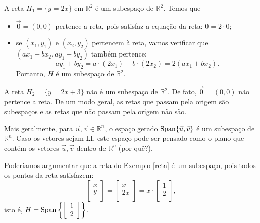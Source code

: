 \documentclass[../livro.tex]{subfiles}  %
\begin{document}
\begin{example}\label{reta}
	A reta $H_1 = \{y = 2x\}$ em $\mathbb{R}^2$ é um subespaço de $\mathbb{R}^2$. Temos que
	\begin{itemize}
		\item $\vec{0} = (0,0)$ pertence a reta, pois satisfaz a equação da reta: $0 = 2\cdot 0$;
		\item se $(x_1, y_1)$ e $(x_2, y_2)$ pertencem à reta, vamos verificar que $(ax_1 + b x_2, ay_1 + b y_2)$ também pertence:
		\begin{equation}
		ay_1 + b y_2 = a \cdot (2x_1) + b\cdot (2x_2) = 2 (ax_1 + b x_2).
		\end{equation} Portanto, $H$ é um subespaço de $\mathbb{R}^2$.
	\end{itemize}
\end{example}

\begin{example}
	A reta $H_2 = \{y = 2x + 3\}$ \underline{não} é um subespaço de $\mathbb{R}^2$. De fato, $\vec{0} = (0,0)$ não pertence a reta. De um modo geral, as retas que passam pela origem são subespaços e as retas que não passam pela origem não são.
\end{example}


\begin{example}
	Mais geralmente, para $\vec{u}, \vec{v} \in \mathbb{R}^n$, o espaço gerado $\operatorname{Span} \{\vec{u}, \vec{v}\}$ é um subespaço de $\mathbb{R}^n$. Caso os vetores sejam LI, este espaço pode ser pensado como o plano que contém os vetores $\vec{u}, \vec{v}$ dentro de $\mathbb{R}^n$ (por quê?).
	
	Poderíamos argumentar que a reta do Exemplo \ref{reta} é um subespaço, pois todos os pontos da reta satisfazem:
	\begin{equation}
	\left[
	\begin{array}{c}
	x \\
	y \\
	\end{array}
	\right] =
	\left[
	\begin{array}{c}
	x \\
	2x \\
	\end{array}
	\right] = x \cdot
	\left[
	\begin{array}{c}
	1 \\
	2 \\
	\end{array}
	\right],
	\end{equation} isto é, $H = \operatorname{Span} \left\{ \left[
	\begin{array}{c}
	1 \\
	2 \\
	\end{array}
	\right] \right\}$.
\end{example}
\end{document}

